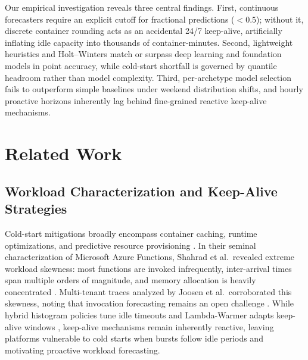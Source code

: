 \documentclass[conference,a4paper]{IEEEtran}
\begin{document}
Our empirical investigation reveals three central findings. First, continuous forecasters require an explicit cutoff for fractional predictions ($<0.5$); without it, discrete container rounding acts as an accidental 24/7 keep-alive, artificially inflating idle capacity into thousands of container-minutes. Second, lightweight heuristics and Holt--Winters match or surpass deep learning and foundation models in point accuracy, while cold-start shortfall is governed by quantile headroom rather than model complexity. Third, per-archetype model selection fails to outperform simple baselines under weekend distribution shifts, and hourly proactive horizons inherently lag behind fine-grained reactive keep-alive mechanisms.

\section{Related Work}
\label{sec:related}

\subsection{Workload Characterization and Keep-Alive Strategies}
Cold-start mitigations broadly encompass container caching, runtime optimizations, and predictive resource provisioning \cite{golec2025survey}. In their seminal characterization of Microsoft Azure Functions, Shahrad et al.\ revealed extreme workload skewness: most functions are invoked infrequently, inter-arrival times span multiple orders of magnitude, and memory allocation is heavily concentrated \cite{shahrad2020serverless}. Multi-tenant traces analyzed by Joosen et al.\ corroborated this skewness, noting that invocation forecasting remains an open challenge \cite{joosen2023function}. While hybrid histogram policies tune idle timeouts \cite{shahrad2020serverless} and Lambda-Warmer adapts keep-alive windows \cite{singh2026lambdawarmer}, keep-alive mechanisms remain inherently reactive, leaving platforms vulnerable to cold starts when bursts follow idle periods and motivating proactive workload forecasting.
\end{document}
